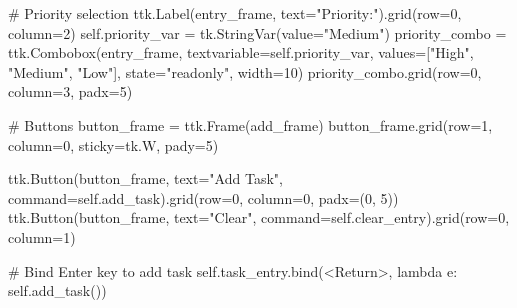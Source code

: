 \documentclass[
  letterpaper,
  DIV=11,
  numbers=noendperiod,
  oneside]{scrreprt}
\newenvironment{Shaded}{}{}
\newcommand{\CommentTok}[1]{\textcolor[rgb]{0.42,0.45,0.49}{#1}}
\newcommand{\DecValTok}[1]{\textcolor[rgb]{0.00,0.36,0.77}{#1}}
\newcommand{\KeywordTok}[1]{\textcolor[rgb]{0.84,0.23,0.29}{#1}}
\newcommand{\NormalTok}[1]{\textcolor[rgb]{0.14,0.16,0.18}{#1}}
\newcommand{\OperatorTok}[1]{\textcolor[rgb]{0.14,0.16,0.18}{#1}}
\newcommand{\StringTok}[1]{\textcolor[rgb]{0.01,0.18,0.38}{#1}}
\newcommand{\VariableTok}[1]{\textcolor[rgb]{0.89,0.38,0.04}{#1}}
\begin{document}
\begin{Shaded}
\begin{Highlighting}[]
        \CommentTok{\# Priority selection}
\NormalTok{        ttk.Label(entry\_frame, text}\OperatorTok{=}\StringTok{"Priority:"}\NormalTok{).grid(row}\OperatorTok{=}\DecValTok{0}\NormalTok{, column}\OperatorTok{=}\DecValTok{2}\NormalTok{)}
        \VariableTok{self}\NormalTok{.priority\_var }\OperatorTok{=}\NormalTok{ tk.StringVar(value}\OperatorTok{=}\StringTok{"Medium"}\NormalTok{)}
\NormalTok{        priority\_combo }\OperatorTok{=}\NormalTok{ ttk.Combobox(entry\_frame, textvariable}\OperatorTok{=}\VariableTok{self}\NormalTok{.priority\_var,}
\NormalTok{                                     values}\OperatorTok{=}\NormalTok{[}\StringTok{"High"}\NormalTok{, }\StringTok{"Medium"}\NormalTok{, }\StringTok{"Low"}\NormalTok{], }
\NormalTok{                                     state}\OperatorTok{=}\StringTok{"readonly"}\NormalTok{, width}\OperatorTok{=}\DecValTok{10}\NormalTok{)}
\NormalTok{        priority\_combo.grid(row}\OperatorTok{=}\DecValTok{0}\NormalTok{, column}\OperatorTok{=}\DecValTok{3}\NormalTok{, padx}\OperatorTok{=}\DecValTok{5}\NormalTok{)}
        
        \CommentTok{\# Buttons}
\NormalTok{        button\_frame }\OperatorTok{=}\NormalTok{ ttk.Frame(add\_frame)}
\NormalTok{        button\_frame.grid(row}\OperatorTok{=}\DecValTok{1}\NormalTok{, column}\OperatorTok{=}\DecValTok{0}\NormalTok{, sticky}\OperatorTok{=}\NormalTok{tk.W, pady}\OperatorTok{=}\DecValTok{5}\NormalTok{)}
        
\NormalTok{        ttk.Button(button\_frame, text}\OperatorTok{=}\StringTok{"Add Task"}\NormalTok{, }
\NormalTok{                  command}\OperatorTok{=}\VariableTok{self}\NormalTok{.add\_task).grid(row}\OperatorTok{=}\DecValTok{0}\NormalTok{, column}\OperatorTok{=}\DecValTok{0}\NormalTok{, padx}\OperatorTok{=}\NormalTok{(}\DecValTok{0}\NormalTok{, }\DecValTok{5}\NormalTok{))}
\NormalTok{        ttk.Button(button\_frame, text}\OperatorTok{=}\StringTok{"Clear"}\NormalTok{, }
\NormalTok{                  command}\OperatorTok{=}\VariableTok{self}\NormalTok{.clear\_entry).grid(row}\OperatorTok{=}\DecValTok{0}\NormalTok{, column}\OperatorTok{=}\DecValTok{1}\NormalTok{)}
        
        \CommentTok{\# Bind Enter key to add task}
        \VariableTok{self}\NormalTok{.task\_entry.bind(}\StringTok{\textquotesingle{}\textless{}Return\textgreater{}\textquotesingle{}}\NormalTok{, }\KeywordTok{lambda}\NormalTok{ e: }\VariableTok{self}\NormalTok{.add\_task())}
    

\end{Highlighting}
\end{Shaded}
\end{document}
